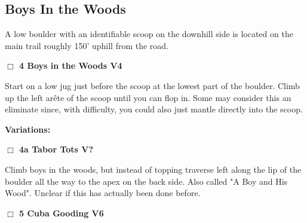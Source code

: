 	\begin{multicols}{2}

\needspace{10em}
\subsection*{Boys In the Woods}\label{bf:Boys In the Woods}

A low boulder with an identifiable scoop on the downhill side is located on the main trail roughly 150' uphill from the road.\\



\needspace{2em}
\label{rt:Boys in the Woods}
\colorbox{RoyalBlue!20}{
\parbox{0.95\linewidth}{
\hspace{-1ex}\textbf{$\Box$
4 Boys in the Woods V4  
}}}
\begin{adjustwidth}{1.3em}{}			

Start on a low jug just before the scoop at the lowest part of the boulder. Climb up the left arête of the scoop until you can flop in. Some may consider this an eliminate since, with difficulty, you could also just mantle directly into the scoop.
\end{adjustwidth}


\begin{adjustwidth}{0.5cm}{}				
\needspace{4em}
\textbf{Variations:} \newline

\needspace{2em}
\label{vr:Tabor Tots}
\colorbox{black!20}{
\parbox{0.95\linewidth}{
\hspace{-1ex}\textbf{$\Box$
4a Tabor Tots V?  
}}}
\begin{adjustwidth}{1.3em}{}			

Climb boys in the woods, but instead of topping traverse left along the lip of the boulder all the way to the apex on the back side. Also called "A Boy and His Wood". Unclear if this has actually been done before.
\end{adjustwidth}



\end{adjustwidth}


\needspace{2em}
\label{rt:Cuba Gooding}
\colorbox{RoyalBlue!20}{
\parbox{0.95\linewidth}{
\hspace{-1ex}\textbf{$\Box$
5 Cuba Gooding V6  
}}}
\begin{adjustwidth}{1.3em}{}			


\end{adjustwidth}
\end{multicols}
